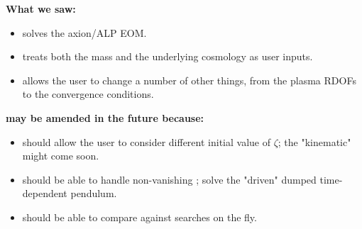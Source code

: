 \documentclass[10pt,utf8,compress,xcolor=dvipsnames]{beamer}
\begin{document}
\begin{frame}[fragile]{\insertsectionhead}
	\begin{center}
		\bf{What we saw:}
	\end{center}
	\begin{itemize}
		\item \mimes solves the axion/ALP EOM. 
		\item \mimes treats both the mass and the underlying cosmology as user inputs.
		\item \mimes allows the user to change a number of other things, from the plasma RDOFs to the convergence conditions.\\[0.5cm] 
	\end{itemize}
	
	\begin{center}
		\bf{\mimes may be amended in the future because:} 
	\end{center}
	\begin{itemize}
		\item \mimes should allow the user to consider different initial value of $\zeta$; the "kinematic" \mimes might come soon.
		\item \mimes should be able to handle non-vanishing \rhs; \ie solve the "driven" dumped time-dependent pendulum.
		\item \mimes should be able to compare against searches on the fly. 
	\end{itemize}
	
\end{frame}
\end{document}
